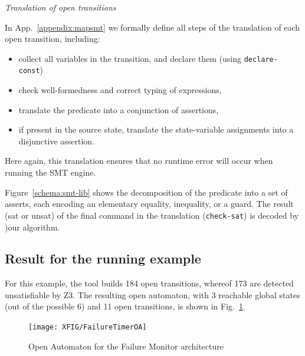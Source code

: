 \documentclass{lncs/llncs}
\newcommand{\Post}{\symb{Post}}
\begin{document}


\emph{Translation of open transitions}

In App.~\ref{appendix:mapsmt} we formally define all steps of the translation of each
open transition, including:
%
\begin{itemize}
\item collect all variables in the transition, and declare them (using \texttt{declare-const})
\item check well-formedness and correct typing of expressions,
\item translate the predicate into a conjunction of assertions,
\item if present in the source state, translate the state-variable
  assignments into a disjunctive assertion.
\end{itemize}
%
Here again, this translation ensures that no runtime error will occur
when running the SMT engine.

Figure~\ref{schema:smt-lib} shows the decomposition of the
predicate into a set of asserts, each encoding an elementary equality,
inequality, or a guard. 
The result (sat or unsat) of the final command in the translation (\texttt{check-sat}) is decoded by
)our algorithm.


\subsection{Result for the running example}
\label{section:resultOA}

For this example, the tool builds 184 open transitions, whereof 173
are detected unsatisfiable by Z3.  The resulting open automaton, with
3 reachable global states (out of the possible 6) and 11 open
transitions, is shown in Fig.~\ref{schema:resultOA}.

\begin{figure}[t]
  \centerline{\texttt{[image: XFIG/FailureTimerOA]}}
  \caption{Open Automaton for the Failure Monitor architecture}
  \label{schema:resultOA}
\end{figure}
\end{document}
